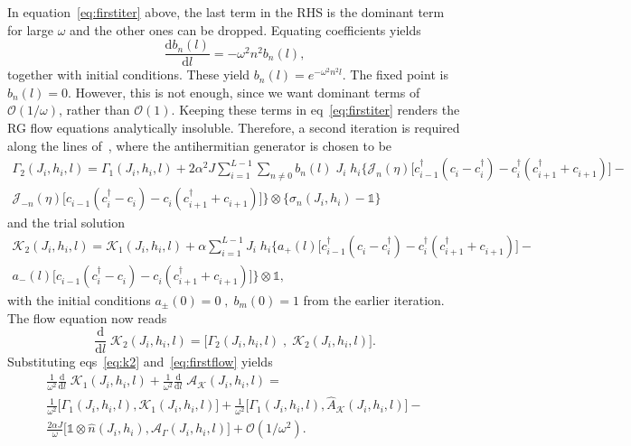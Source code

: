 \documentclass[a4paper,10pt]{article}
\begin{document}
In equation~\ref{eq:firstiter} above, the last term in the RHS is the dominant term for large $\omega$ and the other ones can be dropped. Equating coefficients yields
\begin{equation}
 \frac{\mathrm{d}b_n(l)}{\mathrm{d}l} = -\omega^2 n^2 b_n(l),
\end{equation}
together with initial conditions. These yield $b_n(l) = e^{-\omega^2 n^2 l}$. The fixed point is $b_n(l)=0$. However, this is not enough, since we want dominant terms of $\mathcal{O}(1/\omega)$, rather than  $\mathcal{O}(1)$. Keeping these terms in eq~\ref{eq:firstiter} renders the RG flow equations analytically insoluble. Therefore, a second iteration is required along the lines of~\cite{unitaryflow}, where the antihermitian generator is chosen to be
\begin{multline}
\label{eq:g2}
\Gamma_2(J_i,h_i,l) = \Gamma_1(J_i,h_i,l)+ {2\alpha^2 J}\sum_{i=1}^{L-1}\sum_{n\neq0}  b_n(l)\; J_i\; h_i \bigg\{
\mathcal{J}_n(\eta)\bigg[c^\dagger_{i-1}\left(c^{\;}_i - c^\dagger_i\right) - c^\dagger_i\left( c^\dagger_{i+1}+c^{\;}_{i+1} \right) 
\bigg]-\\
\mathcal{J}_{-n}(\eta)\bigg[c^{\;}_{i-1} \left(c^\dagger_i -c^{\;}_i\right)-c^{\;}_i \left(c^\dagger_{i+1}+c^{\;}_{i+1}\right) 
\bigg]   \bigg\}\otimes \bigg\{\sigma_n(J_i,h_i)-\mathds{1}\bigg\}
\end{multline}
and the trial solution
\begin{multline}
\label{eq:k2}
\mathcal{K}_2(J_i,h_i,l) = \mathcal{K}_1(J_i,h_i,l)+\alpha\sum_{i=1}^{L-1} J_i\; h_i \bigg\{
a_+(l)\bigg[c^\dagger_{i-1}\left(c^{\;}_i - c^\dagger_i\right) - c^\dagger_i\left( c^\dagger_{i+1}+c^{\;}_{i+1} \right) 
\bigg]-\\
a_-(l)\bigg[c^{\;}_{i-1} \left(c^\dagger_i -c^{\;}_i\right)-c^{\;}_i \left(c^\dagger_{i+1}+c^{\;}_{i+1}\right) 
\bigg]   \bigg\}\otimes \mathds{1},
\end{multline}
with the initial conditions $a_\pm(0)=0\;,\;b_m(0)=1$ from the earlier iteration. The flow equation now reads
\begin{equation}
\label{eq:secondflow}
 \frac{\mathrm{d}}{\mathrm{d}l}\;\mathcal{K}_2(J_i,h_i,l) = \bigg[\Gamma_2(J_i,h_i,l)\;,\;\mathcal{K}_2(J_i,h_i,l)\bigg].
\end{equation}
Substituting eqs~\ref{eq:k2} and~\ref{eq:firstflow} yields
\begin{multline}
\label{eq:abeq}
\frac{1}{\omega^2}\frac{\mathrm{d}}{\mathrm{d}l}\;\mathcal{K}_1(J_i,h_i,l) + \frac{1}{\omega^2}\frac{\mathrm{d}}{\mathrm{d}l}\;\mathcal{A}_\mathcal{K}(J_i,h_i,l)=\\
\frac{1}{\omega^2}\bigg[\Gamma_1(J_i,h_i,l),\mathcal{K}_1(J_i,h_i,l) \bigg]+
\frac{1}{\omega^2}\bigg[\Gamma_1(J_i,h_i,l), \hat{A}_\mathcal{K}(J_i,h_i,l)\bigg] -\\
\frac{2\alpha J}{\omega}\bigg[\mathds{1}\otimes\hat{n}(J_i,h_i),\mathcal{A}_\Gamma(J_i,h_i,l) \bigg]+\mathcal{O}(1/\omega^2). 
\end{multline}
\end{document}
